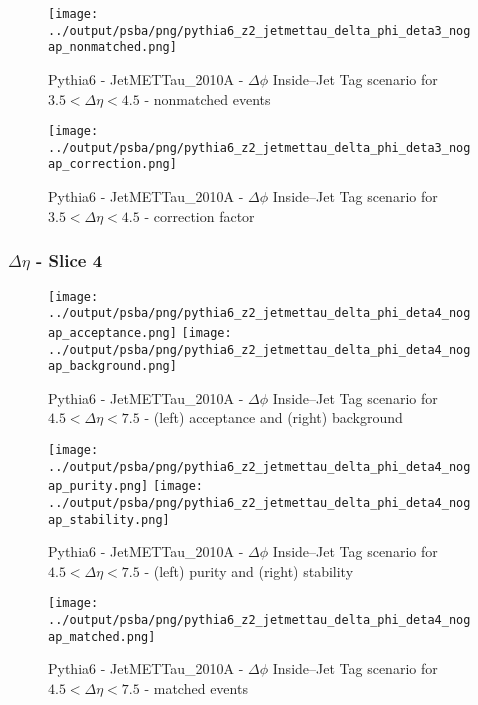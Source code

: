 \documentclass[11pt]{book}
\begin{document}
\begin{figure}[ht]
\centering
\texttt{[image: ../output/psba/png/pythia6\_z2\_jetmettau\_delta\_phi\_deta3\_nogap\_nonmatched.png]}
\caption{Pythia6 - JetMETTau\_2010A - $\Delta\phi$ Inside--Jet Tag scenario for $3.5 < \Delta\eta < 4.5$ - nonmatched events}
\label{fig:p6_jetmettau_delta_phi_deta3_nogap_nonmatched}
\end{figure}

\begin{figure}[ht]
\centering
\texttt{[image: ../output/psba/png/pythia6\_z2\_jetmettau\_delta\_phi\_deta3\_nogap\_correction.png]}
\caption{Pythia6 - JetMETTau\_2010A - $\Delta\phi$ Inside--Jet Tag scenario for $3.5 < \Delta\eta < 4.5$ - correction factor}
\label{fig:p6_jetmettau_delta_phi_deta3_nogap_correction}
\end{figure}

\clearpage
\subsubsection{$\Delta\eta$ - Slice 4}
\begin{figure}[ht]
\centering
\texttt{[image: ../output/psba/png/pythia6\_z2\_jetmettau\_delta\_phi\_deta4\_nogap\_acceptance.png]}
\texttt{[image: ../output/psba/png/pythia6\_z2\_jetmettau\_delta\_phi\_deta4\_nogap\_background.png]}
\caption{Pythia6 - JetMETTau\_2010A - $\Delta\phi$ Inside--Jet Tag scenario for $4.5 < \Delta\eta < 7.5$ - (left) acceptance and (right) background}
\label{fig:p6_jetmettau_delta_phi_deta4_nogap_ab}
\end{figure}

\begin{figure}[ht]
\centering
\texttt{[image: ../output/psba/png/pythia6\_z2\_jetmettau\_delta\_phi\_deta4\_nogap\_purity.png]}
\texttt{[image: ../output/psba/png/pythia6\_z2\_jetmettau\_delta\_phi\_deta4\_nogap\_stability.png]}
\caption{Pythia6 - JetMETTau\_2010A - $\Delta\phi$ Inside--Jet Tag scenario for $4.5 < \Delta\eta < 7.5$ - (left) purity and (right) stability}
\label{fig:p6_jetmettau_delta_phi_deta4_nogap_ps}
\end{figure}

\begin{figure}[ht]
\centering
\texttt{[image: ../output/psba/png/pythia6\_z2\_jetmettau\_delta\_phi\_deta4\_nogap\_matched.png]}
\caption{Pythia6 - JetMETTau\_2010A - $\Delta\phi$ Inside--Jet Tag scenario for $4.5 < \Delta\eta < 7.5$ - matched events}
\label{fig:p6_jetmettau_delta_phi_deta4_nogap_matched}
\end{figure}
\end{document}
